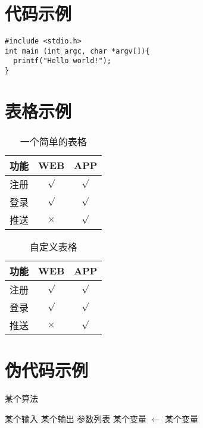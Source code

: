 \documentclass[a4paper,11pt,UTF8,AutoFakeBold]{ctexart}
\begin{document}
\newpage

\begin{appendix}

\section{代码示例}

\begin{lstlisting}[caption={一段C代码},captionpos=b]
#include <stdio.h>
int main (int argc, char *argv[]){
  printf("Hello world!");
}
\end{lstlisting}

\section{表格示例}
\begin{table}[!h!tbp]
\caption{一个简单的表格}\label{tab1}
  \centering
  \begin{tabular}{|l|c|c|}
	\hline
	功能          &WEB         &APP         \\ \hline
	注册          &$\surd$     &$\surd$     \\ \hline
	登录          &$\surd$     &$\surd$     \\ \hline
	推送          &$\times$    &$\surd$     \\ \hline
\end{tabular}
\end{table}

\begin{table}[!h!tbp]
\caption{自定义表格}\label{tab2}
  \centering
\begin{tabular*}{0.75\textwidth}{@{\extracolsep{\fill}}lcc}
    \toprule
    功能          &WEB         &APP         \\
    \midrule
    注册          &$\surd$     &$\surd$     \\
    登录          &$\surd$     &$\surd$     \\
    推送          &$\times$    &$\surd$     \\
    \bottomrule
\end{tabular*}
\end{table}

\section{伪代码示例}

\begin{algorithm}
\caption{某个算法}
\begin{algorithmic}[1]  %
\Require 某个输入
\Ensure 某个输出
 {参数列表}
    \State 某个变量  $\gets$ 某个变量
\EndFunction
\end{algorithmic}
\end{algorithm}


\end{appendix}
\end{document}
